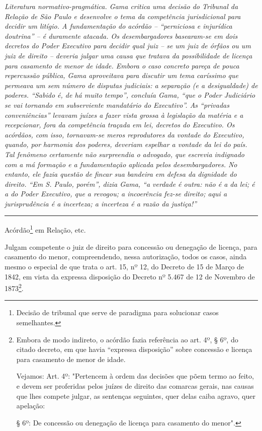\emph{Literatura normativo-pragmática. Gama critica uma decisão do
Tribunal da Relação de São Paulo e desenvolve o tema da competência
jurisdicional para decidir um litígio. A fundamentação do acórdão --
``perniciosa e injurídica doutrina'' -- é duramente atacada. Os
desembargadores basearam-se em dois decretos do Poder Executivo para
decidir qual juiz -- se um juiz de órfãos ou um juiz de direito --
deveria julgar uma causa que tratava da possibilidade de licença para
casamento de menor de idade. Embora o caso concreto pareça de pouca
repercussão pública, Gama aproveitava para discutir um tema caríssimo
que permeava um sem número de disputas judiciais: a separação (e a
desigualdade) de poderes. ``Sabido é, de há muito tempo'', concluía
Gama, ``que o Poder Judiciário se vai tornando em subserviente
mandatário do Executivo''. As ``privadas conveniências'' levavam juízes
a fazer vista grossa à legislação da matéria e a recepcionar, fora da
competência traçada em lei, decretos do Executivo. Os acórdãos, com
isso, tornavam-se meros reprodutores da vontade do Executivo, quando,
por harmonia dos poderes, deveriam espelhar a vontade da lei do país.
Tal fenômeno certamente não surpreendia o advogado, que escrevia
indignado com a má formação e a fundamentação aplicada pelos
desembargadores. No entanto, ele fazia questão de fincar sua bandeira em
defesa da dignidade do direito. ``Em S. Paulo, porém'', dizia Gama, ``a
verdade é outra: não é a da lei; é a do Poder Executivo, que a revogou;
a incoerência fez-se direito; aqui a jurisprudência é a incerteza; a
incerteza é a razão da justiça!''}

\begin{center}\rule{0.5\linewidth}{\linethickness}\end{center}

Acórdão\footnote{Decisão de tribunal que serve de paradigma para
  solucionar casos semelhantes.} em Relação, etc.

Julgam competente o juiz de direito para concessão ou denegação de
licença, para casamento do menor, compreendendo, nessa autorização,
todos os casos, ainda mesmo o especial de que trata o art. 15, nº 12, do
Decreto de 15 de Março de 1842, em vista da expressa disposição do
Decreto nº 5.467 de 12 de Novembro de 1873\footnote{Embora de modo
  indireto, o acórdão fazia referência ao art. 4º, § 6º, do citado
  decreto, em que havia ``expressa disposição'' sobre concessão e
  licença para casamento de menor de idade.

  Vejamos: Art. 4º: "Pertencem à ordem das decisões que põem termo ao
  feito, e devem ser proferidas pelos juízes de direito das comarcas
  gerais, nas causas que lhes compete julgar, as sentenças seguintes,
  quer delas caiba agravo, quer apelação:

  § 6º: De concessão ou denegação de licença para casamento do menor".}.

